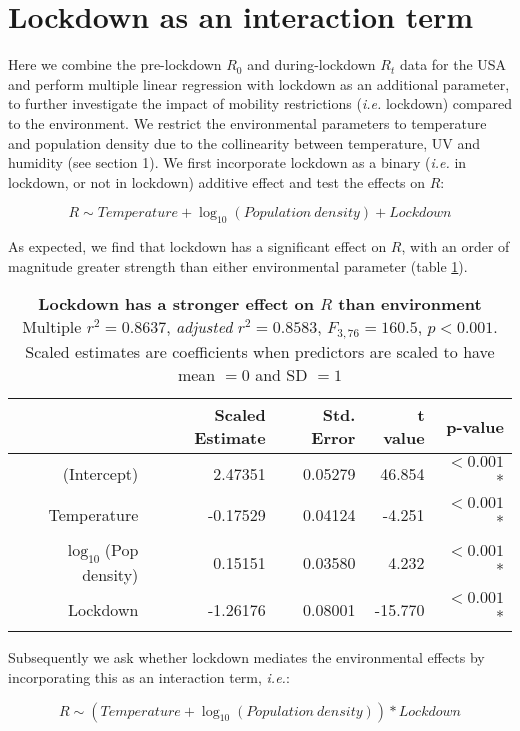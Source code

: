 \documentclass[12pt,english,a4paper]{article}
\newcommand{\RO}{$R_0$\xspace}
\begin{document}
\section{Lockdown as an interaction term}

Here we combine the pre-lockdown \RO and during-lockdown $R_t$ data for the USA and perform multiple linear regression with lockdown as an additional parameter, to further investigate the impact of mobility restrictions (\emph{i.e.} lockdown) compared to the environment. We restrict the environmental parameters to temperature and population density due to the collinearity between temperature, UV and humidity (see section 1). We first incorporate lockdown as a binary (\emph{i.e.} in lockdown, or not in lockdown) additive effect and test the effects on $R$:

\begin{equation*}
    R \sim Temperature + \log_{10}(Population\ density) + Lockdown
\end{equation*}

As expected, we find that lockdown has a significant effect on $R$, with an order of magnitude greater strength than either environmental parameter (table \ref{tab:additive_model}).

\begin{table}[ht]
\centering
\caption{{\bf Lockdown has a stronger effect on $R$ than environment} Multiple $r^2 = 0.8637$, \textsl{adjusted} $r^2 = 0.8583$, $F_{3,76} = 160.5$, $p < 0.001$. Scaled estimates are coefficients when predictors are scaled to have mean $= 0$ and SD $= 1$}
\begin{tabular}{rrrrr}
  \hline
 & Scaled Estimate & Std. Error & t value & p-value \\ 
  \hline
 (Intercept) & 2.47351 & 0.05279 & 46.854 & $< 0.001$* \\ 
  Temperature & -0.17529 & 0.04124 & -4.251 & $< 0.001$* \\ 
  $\log_{10}$(Pop density) & 0.15151 & 0.03580 & 4.232 & $< 0.001$* \\ 
  Lockdown & -1.26176 & 0.08001 & -15.770 & $< 0.001$* \\ 
   \hline
\end{tabular}
\label{tab:additive_model}
\end{table}

Subsequently we ask whether lockdown mediates the environmental effects by incorporating this as an interaction term, \emph{i.e.}:

\begin{equation*}
    R \sim (Temperature + \log_{10}(Population\ density)) * Lockdown
\end{equation*}
\end{document}
